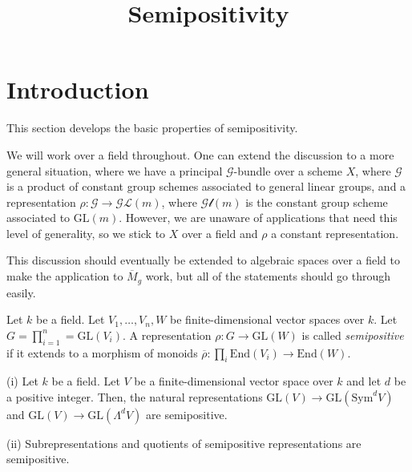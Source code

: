 


\newcommand{\todo}[1]{\footnote{\textbf{TODO.} #1}}


\title{Semipositivity}
\maketitle

\section{Introduction}
This section develops the basic properties of semipositivity.

\begin{remark}
We will work over a field throughout. One can extend the discussion to a more general situation, where we have a principal $\mathcal{G}$-bundle over a scheme $X$, where $\mathcal{G}$ is a product of constant group schemes associated to general linear groups, and a representation $\rho:\mathcal{G}\to\mathcal{GL}(m)$, where $\mathcal{Gl}(m)$ is the constant group scheme associated to $\mathrm{GL}(m)$. However, we are unaware of applications that need this level of generality, so we stick to $X$ over a field and $\rho$ a constant representation.
\end{remark}

\begin{remark}
This discussion should eventually be extended to algebraic spaces over a field to make the application to $\overline{M}_g$ work, but all of the statements should go through easily.
\end{remark}

\begin{definition}
Let $k$ be a field.
Let $V_1,\ldots,V_n,W$ be finite-dimensional vector spaces over $k$.
Let $G=\prod_{i=1}^{n}=\mathrm{GL}(V_i)$.
A representation $\rho:G\rightarrow \mathrm{GL}(W)$ is called \textit{semipositive} if it extends to a morphism of monoids $\overline{\rho}:\prod_i \mathrm{End}(V_i)\rightarrow\mathrm{End}(W)$.
\end{definition}



\begin{lemma}
\item[(i)] Let $k$ be a field. Let $V$ be a finite-dimensional vector space over $k$ and let $d$ be a positive integer. Then, the natural representations $\mathrm{GL}(V)\to \mathrm{GL}(\mathrm{Sym}^dV)$ and $\mathrm{GL}(V)\to \mathrm{GL}(\Lambda^dV)$ are semipositive.
\item[(ii)] Subrepresentations and quotients of semipositive representations are semipositive.
\end{lemma}

